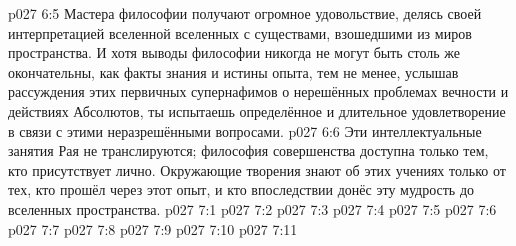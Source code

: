 \vs p027 6:5 Мастера философии получают огромное удовольствие, делясь своей интерпретацией вселенной вселенных с существами, взошедшими из миров пространства. И хотя выводы философии никогда не могут быть столь же окончательны, как факты знания и истины опыта, тем не менее, услышав рассуждения этих первичных супернафимов о нерешённых проблемах вечности и действиях Абсолютов, ты испытаешь определённое и длительное удовлетворение в связи с этими неразрешёнными вопросами.
\vs p027 6:6 Эти интеллектуальные занятия Рая не транслируются; философия совершенства доступна только тем, кто присутствует лично. Окружающие творения знают об этих учениях только от тех, кто прошёл через этот опыт, и кто впоследствии донёс эту мудрость до вселенных пространства.
\vs p027 7:1 
\vs p027 7:2 \pc 
\vs p027 7:3 
\vs p027 7:4 \pc 
\vs p027 7:5 
\vs p027 7:6 
\vs p027 7:7 
\vs p027 7:8 \pc 
\vs p027 7:9 \pc 
\vs p027 7:10 
\vsetoff
\vs p027 7:11 
\quizlink
